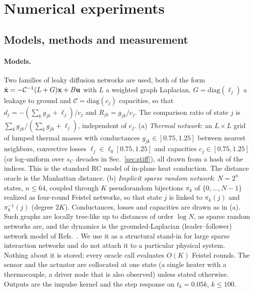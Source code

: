 \section{Numerical experiments}\label{sec:numerics}

\subsection{Models, methods and measurement}\label{sec:setup}
\paragraph*{Models.} Two families of leaky diffusion networks are used, both of the form $\dot{{\bf x}}=-\mathcal{C}^{-1}(L+G){\bf x}+B{\bf u}$ with $L$ a weighted graph Laplacian, $G=\mathrm{diag}(\ell_j)$ a leakage to ground and $\mathcal{C}=\mathrm{diag}(c_j)$ capacities, so that $d_j=-(\sum_kg_{jk}+\ell_j)/c_j$ and $R_{jk}=g_{jk}/c_j$. The comparison ratio of state $j$ is $\sum_kg_{jk}/(\sum_kg_{jk}+\ell_j)$, independent of $c_j$.
(a) \emph{Thermal network}: an $L\times L$ grid of lumped thermal masses with conductances $g_{jk}\in[0.75,1.25]$ between nearest neighbors, convective losses $\ell_j\in\ell_0[0.75,1.25]$ and capacities $c_j\in[0.75,1.25]$ (or log-uniform over $s_C$ decades in Sec.~\ref{sec:stiff}), all drawn from a hash of the indices. This is the standard RC model of in-plane heat conduction. The distance oracle is the Manhattan distance.
(b) \emph{Implicit sparse random network}: $N=2^n$ states, $n\le64$, coupled through $K$ pseudorandom bijections $\pi_k$ of $\{0,\dots,N-1\}$ realized as four-round Feistel networks, so that state $j$ is linked to $\pi_k(j)$ and $\pi_k^{-1}(j)$ (degree $2K$). Conductances, losses and capacities are drawn as in (a). Such graphs are locally tree-like up to distances of order $\log N$, as sparse random networks are, and the dynamics is the grounded-Laplacian (leader--follower) network model of Refs.~\cite{mesbahi2010,pasqualetti2014}. We use it as a structural stand-in for large sparse interaction networks and do not attach it to a particular physical system. Nothing about it is stored; every oracle call evaluates $O(K)$ Feistel rounds.
The sensor and the actuator are collocated at one state (a single heater with a thermocouple, a driver node that is also observed) unless stated otherwise. Outputs are the impulse kernel and the step response on $t_k=0.05k$, $k\le100$.


